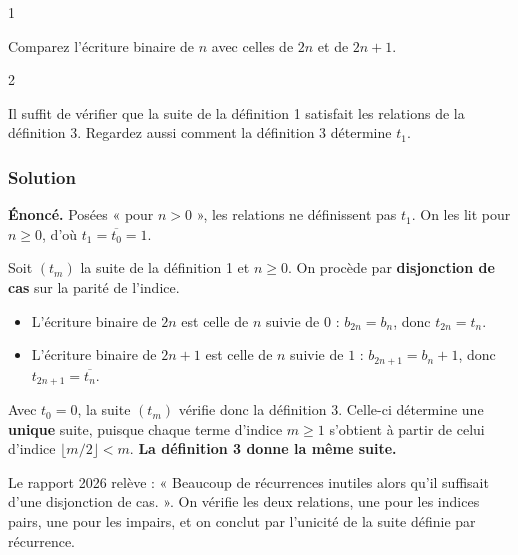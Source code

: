 \documentclass[11pt,a4paper]{article}
\providecommand{\tightlist}{\setlength{\itemsep}{0pt}\setlength{\parskip}{0pt}}
\begin{document}
\begin{indication}{1}

Comparez l'écriture binaire de \(n\) avec celles de \(2n\) et de \(2n+1\).

\end{indication}

\begin{indication}{2}

Il suffit de vérifier que la suite de la définition 1 satisfait les relations de la définition 3. Regardez aussi comment la définition 3 détermine \(t_1\).

\end{indication}

\hypertarget{solution-26}{%
\subsubsection{Solution}\label{solution-26}}

\textbf{Énoncé.} Posées « pour \(n>0\) », les relations ne définissent pas \(t_1\). On les lit pour \(n\ge 0\), d'où \(t_1=\overline{t_0}=1\).

Soit \((t_m)\) la suite de la définition 1 et \(n\ge 0\). On procède par \textbf{disjonction de cas} sur la parité de l'indice.

\begin{itemize}
\tightlist
\item
  L'écriture binaire de \(2n\) est celle de \(n\) suivie de \(0\) : \(b_{2n}=b_n\), donc \(t_{2n}=t_n\).
\item
  L'écriture binaire de \(2n+1\) est celle de \(n\) suivie de \(1\) : \(b_{2n+1}=b_n+1\), donc \(t_{2n+1}=\overline{t_n}\).
\end{itemize}

Avec \(t_0=0\), la suite \((t_m)\) vérifie donc la définition 3. Celle-ci détermine une \textbf{unique} suite, puisque chaque terme d'indice \(m\ge 1\) s'obtient à partir de celui d'indice \(\lfloor m/2\rfloor<m\). \textbf{La définition 3 donne la même suite.}

\begin{jury}

Le rapport 2026 relève : « Beaucoup de récurrences inutiles alors qu'il suffisait d'une disjonction de cas. ». On vérifie les deux relations, une pour les indices pairs, une pour les impairs, et on conclut par l'unicité de la suite définie par récurrence.

\end{jury}
\end{document}

